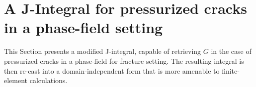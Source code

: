 \section{A J-Integral for pressurized cracks in a phase-field setting}\label{sec:j_integral}



This Section presents a modified J-integral, capable of retrieving $G$ in the case of pressurized cracks in a phase-field for fracture setting. The resulting integral is then re-cast into a domain-independent form that is more amenable to finite-element calculations.  
 



